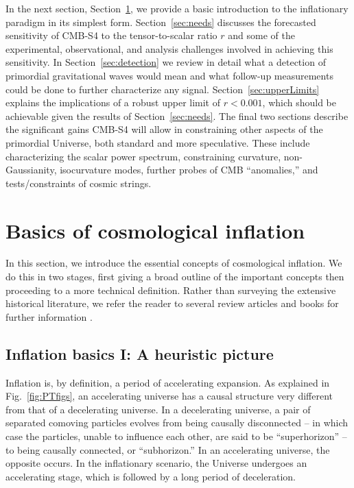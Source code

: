 In the next section, Section~\ref{sec:basics}, we provide a basic introduction to the inflationary paradigm in its simplest form. Section~\ref{sec:needs} discusses the forecasted sensitivity of CMB-S4 to the tensor-to-scalar ratio $r$ and some of the experimental, observational, and analysis challenges involved in achieving this sensitivity. In Section~\ref{sec:detection} we review in detail what a detection of primordial gravitational waves would mean and what follow-up measurements could be done to further characterize any signal. Section~\ref{sec:upperLimits} explains the implications of a robust upper limit of $r<0.001$, which should be achievable given the results of Section~\ref{sec:needs}. The final two sections describe the significant gains CMB-S4 will allow in constraining other aspects of the primordial Universe, both standard and more speculative. These include characterizing the scalar power spectrum, constraining curvature, non-Gaussianity, isocurvature modes, further probes of CMB ``anomalies,'' and tests/constraints of cosmic strings.
 


\section{Basics of cosmological inflation}
\label{sec:basics}

In this section, we introduce the essential concepts of cosmological inflation. We do this in two stages, first giving a broad outline of the important concepts then proceeding to a more technical definition.  Rather than surveying the extensive historical literature, we refer the reader to several review articles and books for further information
\cite{LythRiotto,LiddleLyth,Mukhanov2005,Baumann:2009ds,Linde2006,EllisWands}.

\subsection{Inflation basics I: A heuristic picture}

Inflation is, by definition, a period of accelerating expansion. As explained in Fig.~\ref{fig:PTfigs}, an accelerating universe has a causal structure very different from that of a decelerating universe. In a decelerating universe, a pair of separated comoving particles evolves from being causally disconnected -- in which case the particles, unable to influence each other, are said to be ``superhorizon'' -- to being causally connected, or ``subhorizon.'' In an accelerating universe, the opposite occurs. In the inflationary scenario, the Universe undergoes an accelerating stage, which is followed by a long period of deceleration.


